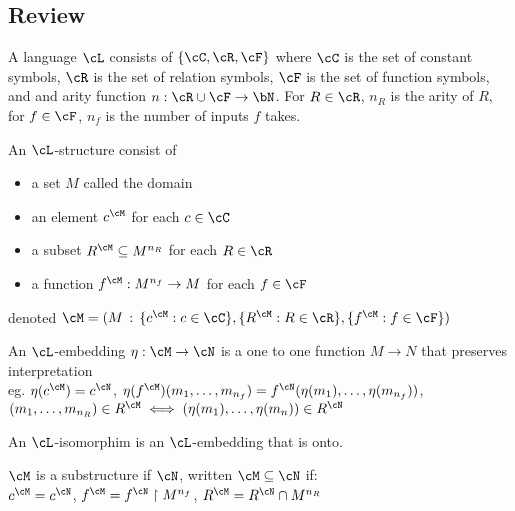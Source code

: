 \subsection{Review}

\begin{definition}
    A language $\cL$ consists of $\{ \cC , \cR, \cF \}$ where $\cC$ is the set of constant symbols, $\cR$ is the set of relation symbols, $\cF$ is the set of function symbols, and and arity function $n : \cR \cup \cF \to \bN$. For $R \in \cR$, $n_R$ is the arity of $R$, for $f \in \cF$, $n_f$ is the number of inputs $f$ takes. 
\end{definition}

\begin{definition}
    An $\cL$-structure consist of 
    \begin{itemize}
        \item a set $M$ called the domain 
        \item an element $c^{\cM}$ for each $c \in \cC$
        \item a subset $R^{\cM} \subseteq M^{n_R}$ for each $R \in \cR$
        \item a function $f^{\cM}: M^{n_f} \to M$ for each $f \in \cF$ 
    \end{itemize}
    denoted $\cM = (M \, : \, \{c^{\cM} : c \in \cC\} , \{R^{\cM} : R \in \cR \} , \{f^{\cM} : f \in \cF\})$
\end{definition}

\begin{definition}
    An $\cL$-embedding $\eta : \cM \to \cN$ is a one to one function $M \to N$ that preserves interpretation \\
    eg. $\eta(c^{\cM}) = c^{\cN}$, $\eta(f^{\cM})(m_1, \ldots, m_{n_f}) = f^{\cN} (\eta(m_1), \ldots, \eta(m_{n_f}))$, \\
     $(m_1, \ldots, m_{n_R}) \in R^{\cM} \iff (\eta(m_1), \ldots, \eta(m_n)) \in R^{\cN}$
\end{definition}

\begin{definition}
    An $\cL$-isomorphim is an $\cL$-embedding that is onto. 
\end{definition}

\begin{definition}
    $\cM$ is a substructure if $\cN$, written $\cM \subseteq \cN$ if: \\
    $c^{\cM} = c^{\cN}$, $f^{\cM} = f^{\cN} \upharpoonright M^{n_f}$, $R^{\cM} = R^{\cN} \cap M^{n_R}$
\end{definition}

